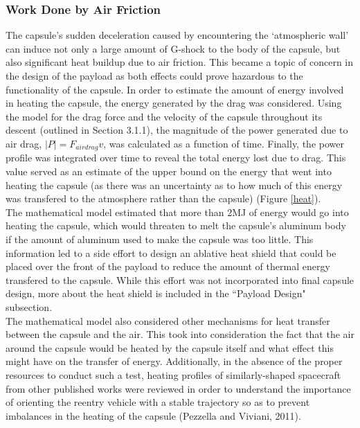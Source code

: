 \documentclass{article}
\begin{document}
\begin{doublespace}
		\subsubsection{Work Done by Air Friction}
		\indent\indent The capsule's sudden deceleration caused by encountering the `atmospheric wall' can induce not only a large amount of G-shock to the body of the capsule, but also significant heat buildup due to air friction. This became a topic of concern in the design of the payload as both effects could prove hazardous to the functionality of the capsule. In order to estimate the amount of energy involved in heating the capsule, the energy generated by the drag was considered. Using the model for the drag force and the velocity of the capsule throughout its descent (outlined in Section 3.1.1), the magnitude of the power generated due to air drag, $|P|=F_{air drag}v$, was calculated as a function of time. Finally, the power profile was integrated over time to reveal the total energy lost due to drag. This value served as an estimate of the upper bound on the energy that went into heating the capsule (as there was an uncertainty as to how much of this energy was transfered to the atmosphere rather than the capsule) (Figure \ref{heat}).\\
		\indent The mathematical model estimated that more than 2MJ of energy would go into heating the capsule, which would threaten to melt the capsule's aluminum body if the amount of aluminum used to make the capsule was too little. This information led to a side effort to design an ablative heat shield that could be placed over the front of the payload to reduce the amount of thermal energy transfered to the capsule. While this effort was not incorporated into final capsule design, more about the heat shield is included in the ``Payload Design" subsection.\\
		\indent The mathematical model also considered other mechanisms for heat transfer between the capsule and the air. This took into consideration the fact that the air around the capsule would be heated by the capsule itself and what effect this might have on the transfer of energy. Additionally, in the absence of the proper resources to conduct such a test, heating profiles of similarly-shaped spacecraft from other published works were reviewed in order to understand the importance of orienting the reentry vehicle with a stable trajectory so as to prevent imbalances in the heating of the capsule (Pezzella and Viviani, 2011). 


\end{doublespace}
\end{document}
